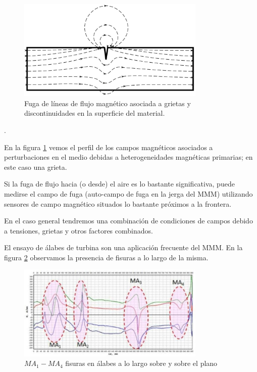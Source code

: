 \begin{figure}[h]
	\centering
	\includegraphics[width=0.8\textwidth]{./Figures/fig51}
	\caption{Fuga de líneas de flujo magnético asociada a grietas y discontinuidades en la superficie del material.}
	\label{fig:51}
\end{figure}. 

En la figura \ref{fig:51} vemos el perfil de los campos magnéticos asociados a perturbaciones en el medio debidas a heterogeneidades magnéticas primarias; en este caso una grieta.

Si la fuga de flujo hacia (o desde) el aire es lo bastante significativa, puede medirse el campo de fuga (auto-campo de fuga en la jerga del MMM) utilizando sensores de campo magnético situados lo bastante próximos a la frontera.


En el caso general tendremos una combinación de condiciones de campos debido a tensiones, grietas y otros factores combinados.


El ensayo de álabes de turbina son una aplicación frecuente del MMM. En la figura \ref{fig:52} observamos la presencia de fisuras a lo largo de la misma.

\begin{figure}[H]
    \centering
    \includegraphics[width=0.8\textwidth]{./Figures/fig52}
	\caption{$MA_{1}-MA_{4}$ fisuras en álabes a lo largo sobre y sobre el plano}
	\label{fig:52}
\end{figure}

